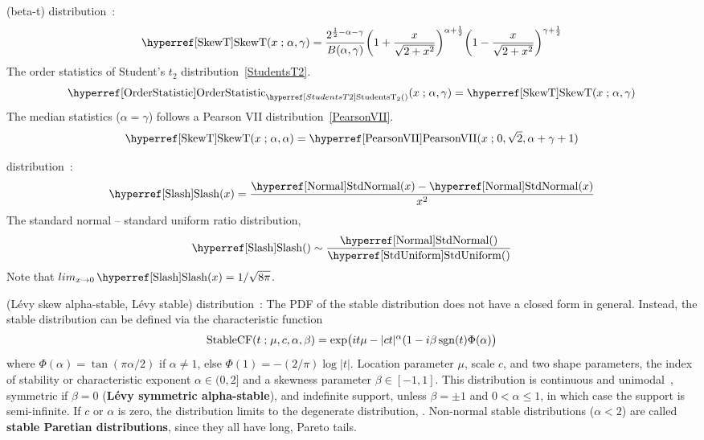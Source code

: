 \secbreak
 (beta-t) distribution~\cite{Jones2004}:
\begin{align}
\label{SkewT}
	\opr{SkewT}(x\given \alpha, \gamma) = 
	\frac{2^{\half-\alpha-\gamma}}{B(\alpha, \gamma)}
	\Left(1 + \frac{x}{\sqrt{2+x^2}} \Right)^{\alpha+\half}
	\Left(1 - \frac{x}{\sqrt{2+x^2}} \Right)^{\gamma+\half}	
\end{align}
The order statistics  of Student's $t_2$ distribution~\eqref{StudentsT2}.
\[
\opr{OrderStatistic}_{\StudentsTT()}(x \given \alpha, \gamma)
= \opr{SkewT}(x\given \alpha, \gamma) 
\notag
\]
The median statistics ($\alpha=\gamma$) follows a Pearson VII distribution~\eqref{PearsonVII}.
\[
\opr{SkewT}(x\given \alpha, \alpha) = \opr{PearsonVII}(x\given 0, \sqrt{2}, \alpha+\gamma+1)
\notag
\]



\secbreak
 distribution~\cite{Rogers1972, Johnson1994}:
\begin{align}
\label{Slash}
	\opr{Slash}(x) = \frac{\oprr{StdNormal}{Normal}(x)-\oprr{StdNormal}{Normal}(x)}{x^2} \checked
\end{align}
The standard normal -- standard uniform ratio distribution,
\[
\opr{Slash}() \sim \frac{\oprr{StdNormal}{Normal}()}{\opr{StdUniform}()} \checked
\notag
\]
Note that $lim_{x\rightarrow 0} \opr{Slash}(x)= 1/\sqrt{8\pi}$\checked.


\secbreak

 (L\'evy skew alpha-stable, L\'{e}vy stable) distribution~\cite{Nolan2015}:
 The PDF of the stable distribution does not have a closed form in general. Instead,  the stable distribution can be defined via the characteristic function 
\begin{align}
\label{Stable}
\operatorname{StableCF}(t\mathrel{;} \mu,c,\alpha,\beta) = 
\exp \bigl(i t \mu - |c t|^{\alpha} (1 - i\beta \operatorname{sgn}(t) \Phi(\alpha) \bigr) 
\end{align}
where $\Phi(\alpha)=\tan(\pi \alpha/2)$ if $\alpha \neq 1$, else $\Phi(1)=-(2/\pi)\log|t|$. Location parameter $\mu$, scale $c$, and two shape parameters, the index of stability or characteristic exponent $\alpha\in(0,2]$ and a skewness parameter $\beta \in[-1,1]$. This distribution is continuous and unimodal~\cite{Yamazato1978}, symmetric if $\beta=0$ ({\bf L\'evy symmetric alpha-stable}), and indefinite support, unless $\beta=\pm1$ and $0<\alpha\leq1$, in which case the support is semi-infinite. If $c$ or $\alpha$ is zero, the distribution limits to the degenerate distribution,  . Non-normal stable distributions ($\alpha<2$) are called {\bf stable Paretian distributions}, since they all have long, Pareto tails.

